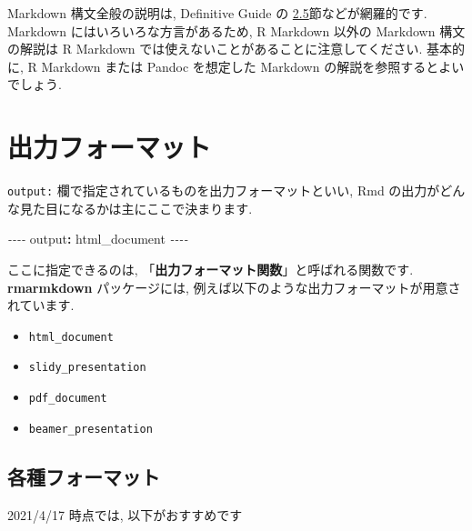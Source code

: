 \documentclass[
]{bxjsarticle}
\newenvironment{Shaded}{\begin{snugshade}}{\end{snugshade}}
\newcommand{\AttributeTok}[1]{\textcolor[rgb]{0.77,0.63,0.00}{#1}}
\newcommand{\FunctionTok}[1]{\textcolor[rgb]{0.00,0.00,0.00}{#1}}
\newcommand{\KeywordTok}[1]{\textcolor[rgb]{0.13,0.29,0.53}{\textbf{#1}}}
\newcommand{\PreprocessorTok}[1]{\textcolor[rgb]{0.56,0.35,0.01}{\textit{#1}}}
\providecommand{\tightlist}{%
  \setlength{\itemsep}{0pt}\setlength{\parskip}{0pt}}
\begin{document}
Markdown 構文全般の説明は, Definitive Guide の \href{https://bookdown.org/yihui/rmarkdown/markdown-syntax.html}{2.5}節などが網羅的です. Markdown にはいろいろな方言があるため, R Markdown 以外の Markdown 構文の解説は R Markdown では使えないことがあることに注意してください. 基本的に, R Markdown または Pandoc を想定した Markdown の解説を参照するとよいでしょう.

\hypertarget{ux51faux529bux30d5ux30a9ux30fcux30deux30c3ux30c8}{%
\section{出力フォーマット}\label{ux51faux529bux30d5ux30a9ux30fcux30deux30c3ux30c8}}

\texttt{output:} 欄で指定されているものを出力フォーマットといい, Rmd の出力がどんな見た目になるかは主にここで決まります.

\begin{Shaded}
\begin{Highlighting}[numbers=left,,]
\PreprocessorTok{{-}{-}{-}{-}}
\FunctionTok{output}\KeywordTok{:}\AttributeTok{ html\_document}
\PreprocessorTok{{-}{-}{-}{-}}
\end{Highlighting}
\end{Shaded}

ここに指定できるのは, 「\textbf{出力フォーマット関数}」と呼ばれる関数です. \textbf{rmarmkdown} パッケージには, 例えば以下のような出力フォーマットが用意されています.

\begin{itemize}
\tightlist
\item
  \texttt{html\_document}
\item
  \texttt{slidy\_presentation}
\item
  \texttt{pdf\_document}
\item
  \texttt{beamer\_presentation}
\end{itemize}

\hypertarget{ux5404ux7a2eux30d5ux30a9ux30fcux30deux30c3ux30c8}{%
\subsection{各種フォーマット}\label{ux5404ux7a2eux30d5ux30a9ux30fcux30deux30c3ux30c8}}

2021/4/17 時点では, 以下がおすすめです
\end{document}
